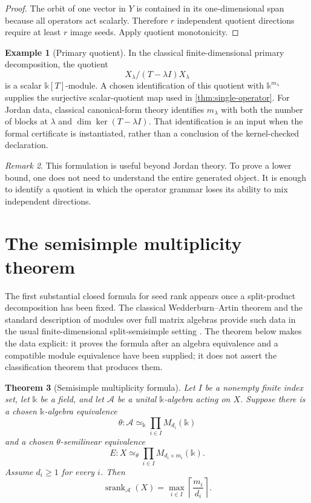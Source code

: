 \documentclass[11pt]{article}
\newtheorem{theorem}{Theorem}[section]
\theoremstyle{definition}
\newtheorem{example}[theorem]{Example}
\theoremstyle{remark}
\newtheorem{remark}[theorem]{Remark}
\newcommand{\cA}{\mathcal A}
\newcommand{\srank}{\operatorname{srank}}
\newcommand{\bbk}{\mathbb{k}}
\begin{document}
\begin{proof}
The orbit of one vector in $Y$ is contained in its one-dimensional span because all operators act scalarly. Therefore $r$ independent quotient directions require at least $r$ image seeds. Apply quotient monotonicity.
\end{proof}

\begin{example}[Primary quotient]
In the classical finite-dimensional primary decomposition, the quotient
\[
X_{\lambda}/(T-\lambda I)X_{\lambda}
\]
is a scalar $\bbk[T]$-module. A chosen identification of this quotient with
$\bbk^{m_{\lambda}}$ supplies the surjective scalar-quotient map used in
\cref{thm:single-operator}. For Jordan data, classical canonical-form theory
identifies $m_{\lambda}$ with both the number of blocks at $\lambda$ and
$\dim\ker(T-\lambda I)$. That identification is an input when the formal
certificate is instantiated, rather than a conclusion of the kernel-checked
declaration.
\end{example}

\begin{remark}
This formulation is useful beyond Jordan theory. To prove a lower bound, one does not need to understand the entire generated object. It is enough to identify a quotient in which the operator grammar loses its ability to mix independent directions.
\end{remark}

\section{The semisimple multiplicity theorem}

The first substantial closed formula for seed rank appears once a split-product decomposition has been fixed. The classical Wedderburn--Artin theorem and the standard description of modules over full matrix algebras provide such data in the usual finite-dimensional split-semisimple setting \cite[Ch.~1]{lam2001noncommutative}\cite[Ch.~7]{lam1999modules}. The theorem below makes the data explicit: it proves the formula after an algebra equivalence and a compatible module equivalence have been supplied; it does not assert the classification theorem that produces them.

\begin{theorem}[Semisimple multiplicity formula]
\label{thm:semisimple}
Let $I$ be a nonempty finite index set, let $\bbk$ be a field, and let $\cA$ be a unital $\bbk$-algebra acting on $X$. Suppose there is a chosen $\bbk$-algebra equivalence
\[
\theta:\cA\simeq_{\bbk}\prod_{i\in I}M_{d_i}(\bbk)
\]
and a chosen $\theta$-semilinear equivalence
\[
E:X\simeq_{\theta}\prod_{i\in I}M_{d_i\times m_i}(\bbk).
\]
Assume $d_i\ge1$ for every $i$. Then
\[
\boxed{
\srank_{\cA}(X)
=
\max_{i\in I}
\left\lceil\frac{m_i}{d_i}\right\rceil.
}
\]
\end{theorem}
\end{document}
